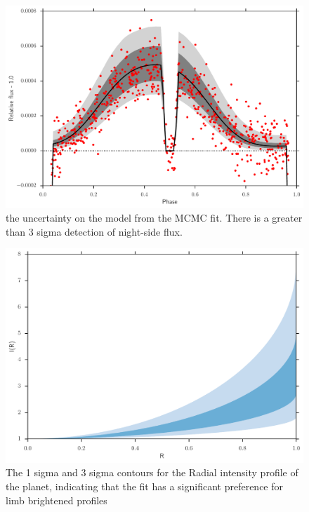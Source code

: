 \documentclass[a4paper,fleqn,usenatbib]{mnras}
\begin{document}
\begin{figure}
\begin{center}
\includegraphics[width=\columnwidth]{img/model.pdf}
\caption{the uncertainty on the model from the MCMC fit. There is a greater than 3 sigma detection of night-side flux.}
\label{fig:model}
\end{center}
\end{figure}

\begin{figure}
\begin{center}
\includegraphics[width=\columnwidth]{img/ld_prof.pdf}
\caption{The 1 sigma and 3 sigma contours for the Radial intensity profile of the planet, indicating that the fit has a significant preference for limb brightened profiles }
\label{fig:limb brighten}
\end{center}
\end{figure}
\end{document}
